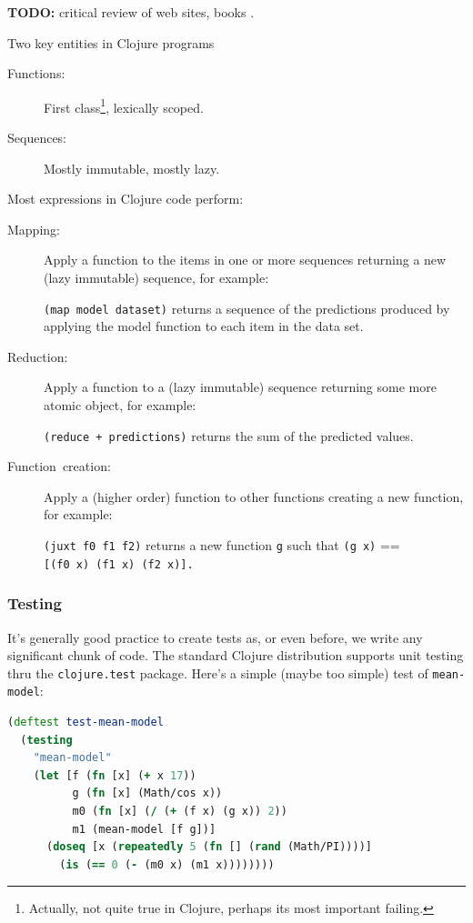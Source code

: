 \documentclass[10pt,openany]{article}
\numberwithin{definition}{section}
\numberwithin{example}{section}
\numberwithin{equation}{section}
\numberwithin{figure}{section}
\begin{document}
\textbf{TODO: }critical review of web sites, books \cite{emerick2011clojure,fogus2011clojure,halloway2009clojure,rathore2011clojure}.

Two key entities in Clojure programs
\begin{description}
\item [{Functions:}] First class\footnote{Actually, not quite true in Clojure, perhaps its most important failing.},
lexically scoped.
\item [{Sequences:}] Mostly immutable, mostly lazy.
\end{description}
Most expressions in Clojure code perform:
\begin{description}
\item [{Mapping:}] Apply a function to the items in one or more sequences
returning a new (lazy immutable) sequence, for example:


\texttt{(map~model~dataset)} returns a sequence of the predictions
produced by applying the model function to each item in the data set.

\item [{Reduction:}] Apply a function to a (lazy immutable) sequence returning
some more atomic object, for example:


\texttt{(reduce~+~predictions)} returns the sum of the predicted
values.

\item [{Function~creation:}] Apply a (higher order) function to other
functions creating a new function, for example:


\texttt{(juxt~f0~f1~f2)} returns a new function \texttt{g} such
that \texttt{(g~x)} == \texttt{{[}(f0~x)~(f1~x)~(f2~x){]}.}

\end{description}

\subsubsection{Testing}

It's generally good practice to create tests as, or even before, we
write any significant chunk of code. The standard Clojure distribution
supports unit testing thru the \texttt{clojure.test} package. Here's
a simple (maybe too simple) test of \texttt{mean-model}:

\begin{lstlisting}[caption={Trivial unit test for \texttt{mean-model}},label={lis:test-mean-model},language=clojure,tabsize=2]
(deftest test-mean-model
  (testing
    "mean-model"
    (let [f (fn [x] (+ x 17)) 
          g (fn [x] (Math/cos x))
          m0 (fn [x] (/ (+ (f x) (g x)) 2))
          m1 (mean-model [f g])]
      (doseq [x (repeatedly 5 (fn [] (rand (Math/PI))))]
        (is (== 0 (- (m0 x) (m1 x))))))))
\end{lstlisting}
\end{document}
